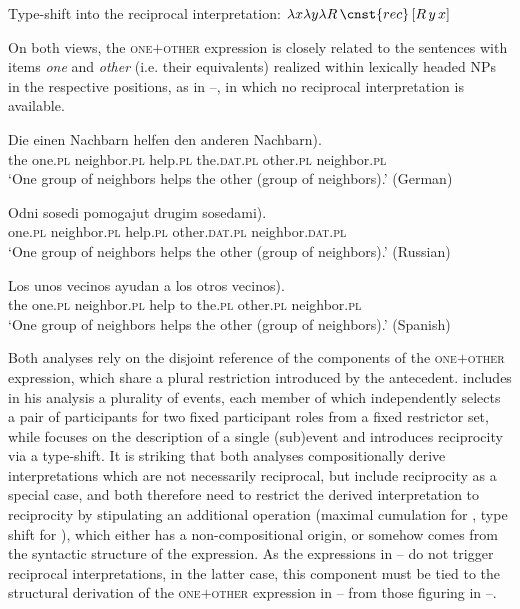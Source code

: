 \documentclass[output=paper,colorlinks,citecolor=brown]{langscibook}
\begin{document}
\ea\label{ex:arsenijevic:Definite2}
Type-shift into the reciprocal interpretation: $\lambda x \lambda y \lambda R \, \cnst{rec}\, [R \, y \, x]$
\z

\noindent On both views, the \textsc{one$+$other} expression is closely related to the sentences with items \textit{one} and \textit{other} (i.e. their equivalents) realized within lexically headed NPs in the respective positions, as in --, in which no reciprocal interpretation is available.

\ea\label{ex:arsenijevic:Einen}
\gll Die einen Nachbarn helfen den anderen \minsp{(} Nachbarn).\\
the one.\textsc{pl} neighbor.\textsc{pl} help.\textsc{pl} the.\textsc{dat.\textsc{pl}} other.\textsc{pl} {} neighbor.\textsc{pl}\\
\glt `One group of neighbors helps the other (group of neighbors).' \hfill (German)
\z

\ea\label{ex:arsenijevic:Odni}
\gll Odni sosedi pomogajut drugim \minsp{(} sosedami).\\
one.\textsc{pl} neighbor.\textsc{pl} help.\textsc{pl} other.\textsc{dat.\textsc{pl}} {} neighbor.\textsc{dat.\textsc{pl}}\\
\glt `One group of neighbors helps the other (group of neighbors).' \hfill (Russian)
\z

\ea\label{ex:arsenijevic:Unos}
\gll Los unos vecinos ayudan a los otros \minsp{(} vecinos).\\
the one.\textsc{pl} neighbor.\textsc{pl} help to the.\textsc{pl} other.\textsc{pl} {} neighbor.\textsc{pl}\\

\glt `One group of neighbors helps the other (group of neighbors).' \hfill (Spanish)
\z 

\noindent Both analyses rely on the disjoint reference of the components of the \textsc{one$+$other} expression, which share a plural restriction introduced by the antecedent. \citet{v10} %
includes in his analysis a plurality of events, each member of which independently selects a pair of participants for two fixed participant roles from a fixed restrictor set, while \citet{z14} %
focuses on the description of a single (sub)event and introduces reciprocity via a type-shift. It is striking that both analyses compositionally derive interpretations which are not necessarily reciprocal, but include reciprocity as a special case, and both therefore need to restrict the derived interpretation to reciprocity by stipulating an additional operation (maximal cumulation for \citeauthor{v10}, type shift for \citeauthor{z14}%
), which either has a non-compositional origin, or somehow comes from the syntactic structure of the expression. As the expressions in -- do not trigger reciprocal
interpretations, in the latter case, this component must be tied to the structural derivation of the \textsc{one$+$other} expression in -- from those figuring in --.
\end{document}
